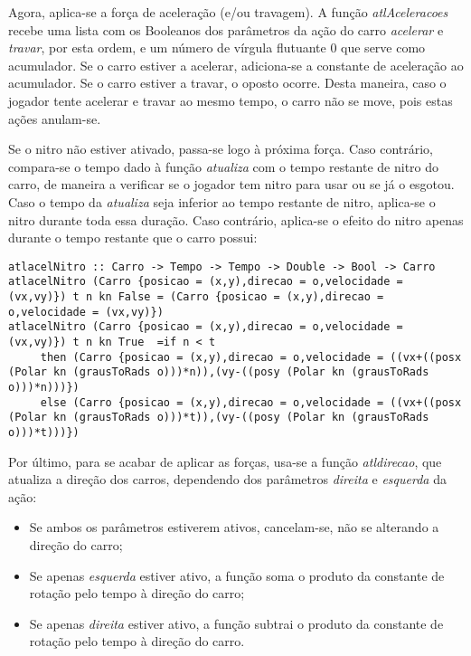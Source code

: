 \documentclass[a4paper]{report}
\begin{document}
Agora, aplica-se a força de aceleração (e/ou travagem). A função \textit{atlAceleracoes} recebe uma lista com os Booleanos dos parâmetros da ação do carro \textit{acelerar} e \textit{travar}, por esta ordem, e um número de vírgula flutuante 0 que serve como acumulador. Se o carro estiver a acelerar, adiciona-se a constante de aceleração ao acumulador. Se o carro estiver a travar, o oposto ocorre. Desta maneira, caso o jogador tente acelerar e travar ao mesmo tempo, o carro não se move, pois estas ações anulam-se.

Se o nitro não estiver ativado, passa-se logo à próxima força. Caso contrário, compara-se o tempo dado à função \textit{atualiza} com o tempo restante de nitro do carro, de maneira a verificar se o jogador tem nitro para usar ou se já o esgotou. Caso o tempo da \textit{atualiza} seja inferior ao tempo restante de nitro, aplica-se o nitro durante toda essa duração. Caso contrário, aplica-se o efeito do nitro apenas durante o tempo restante que o carro possui:

\begin{lstlisting}
atlacelNitro :: Carro -> Tempo -> Tempo -> Double -> Bool -> Carro
atlacelNitro (Carro {posicao = (x,y),direcao = o,velocidade = (vx,vy)}) t n kn False = (Carro {posicao = (x,y),direcao = o,velocidade = (vx,vy)})
atlacelNitro (Carro {posicao = (x,y),direcao = o,velocidade = (vx,vy)}) t n kn True  =if n < t 
     then (Carro {posicao = (x,y),direcao = o,velocidade = ((vx+((posx (Polar kn (grausToRads o)))*n)),(vy-((posy (Polar kn (grausToRads o)))*n)))})
     else (Carro {posicao = (x,y),direcao = o,velocidade = ((vx+((posx (Polar kn (grausToRads o)))*t)),(vy-((posy (Polar kn (grausToRads o)))*t)))})
\end{lstlisting}

Por último, para se acabar de aplicar as forças, usa-se a função \textit{atldirecao}, que atualiza a direção dos carros, dependendo dos parâmetros \textit{direita} e \textit{esquerda} da ação:

\begin{itemize}
    \item Se ambos os parâmetros estiverem ativos, cancelam-se, não se alterando a direção do carro;
    \item Se apenas \textit{esquerda} estiver ativo, a função soma o produto da constante de rotação pelo tempo à direção do carro;
    \item Se apenas \textit{direita} estiver ativo, a função subtrai o produto da constante de rotação pelo tempo à direção do carro.
\end{itemize}
\end{document}
